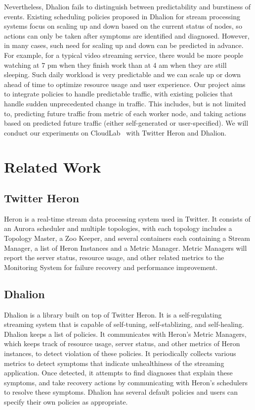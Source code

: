 \documentclass[pdftex,twocolumn,10pt,letterpaper]{article}
\begin{document}
Nevertheless, Dhalion fails to distinguish between predictability and burstiness of events. Existing scheduling policies proposed in Dhalion for stream processing systems focus on scaling up and down based on the current status of nodes, so actions can only be taken after symptoms are identified and diagnosed. However, in many cases, such need for scaling up and down can be predicted in advance. For example, for a typical video streaming service, there would be more people watching at 7 pm when they finish work than at 4 am when they are still sleeping. Such daily workload is very predictable and we can scale up or down ahead of time to optimize resource usage and user experience. Our project aims to integrate policies to handle predictable traffic, with existing policies that handle sudden unprecedented change in traffic. This includes, but is not limited to, predicting future traffic from metric of each worker node, and taking actions based on predicted future traffic (either self-generated or user-specified). We will conduct our experiments on CloudLab~\cite{RicciEide} with Twitter Heron and Dhalion. 
\section{Related Work}



\subsection{Twitter Heron}
Heron is a real-time stream data processing system used in Twitter. It consists of an Aurora scheduler and multiple topologies, with each topology includes a Topology Master, a Zoo Keeper, and several containers each containing a Stream Manager, a list of Heron Instances and a Metric Manager. Metric Managers will report the server status, resource usage, and other related metrics to the Monitoring System for failure recovery and performance improvement. 


\subsection{Dhalion}
Dhalion is a library built on top of Twitter Heron. It is a self-regulating streaming system that is capable of self-tuning, self-stablizing, and self-healing. Dhalion keeps a list of policies. It communicates with Heron's Metric Managers, which keeps track of resource usage, server status, and other metrics of Heron instances, to detect violation of these policies. It periodically collects various metrics to detect symptoms that indicate unhealthiness of the streaming application. Once detected, it attempts to find diagnoses that explain these symptoms, and take recovery actions by communicating with Heron's schedulers to resolve these symptoms. Dhalion has several default policies and users can specify their own policies as appropriate. 
\end{document}
